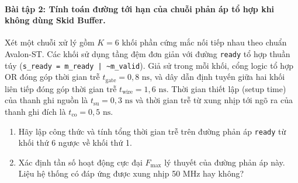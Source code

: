 \paragraph{Bài tập 2: Tính toán đường tới hạn của chuỗi phản áp tổ hợp khi không dùng Skid Buffer.}
Xét một chuỗi xử lý gồm $K = 6$ khối phần cứng mắc nối tiếp nhau theo chuẩn Avalon-ST. Các khối sử dụng tầng đệm đơn giản với đường \texttt{ready} tổ hợp thuần túy (\texttt{s\_ready = m\_ready | \~{}m\_valid}). Giả sử trong mỗi khối, cổng logic tổ hợp OR đóng góp thời gian trễ $t_{\text{gate}} = 0{,}8\text{ ns}$, và dây dẫn định tuyến giữa hai khối liên tiếp đóng góp thời gian trễ $t_{\text{wire}} = 1{,}6\text{ ns}$. Thời gian thiết lập (setup time) của thanh ghi nguồn là $t_{\text{su}} = 0{,}3\text{ ns}$ và thời gian trễ từ xung nhịp tới ngõ ra của thanh ghi đích là $t_{\text{co}} = 0{,}5\text{ ns}$.
\begin{enumerate}[label=(\alph*)]
    \item Hãy lập công thức và tính tổng thời gian trễ trên đường phản áp \texttt{ready} từ khối thứ 6 ngược về khối thứ 1.
    \item Xác định tần số hoạt động cực đại $F_{\max}$ lý thuyết của đường phản áp này. Liệu hệ thống có đáp ứng được xung nhịp 50 MHz hay không?
\end{enumerate}

